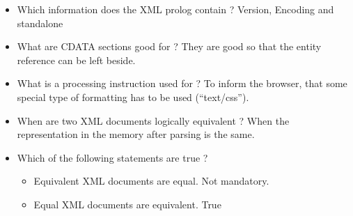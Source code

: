 \begin{itemize}
\item Which information does the XML prolog contain ?
\subitem Version, Encoding and standalone
\item What are CDATA sections good for ?
\subitem They are good so that the entity reference can be left beside.
\item What is a processing instruction used for ?
\subitem To inform the browser, that some special type of formatting has to be used ("`text/css"').
\item When are two XML documents logically equivalent ?
\subitem When the representation in the memory after parsing is the same.
\item Which of the following statements are true ?
\subitem \begin{itemize}
\item Equivalent XML documents are equal.
\subitem Not mandatory.
\item Equal XML documents are equivalent.
\subitem True
\end{itemize}
\end{itemize}